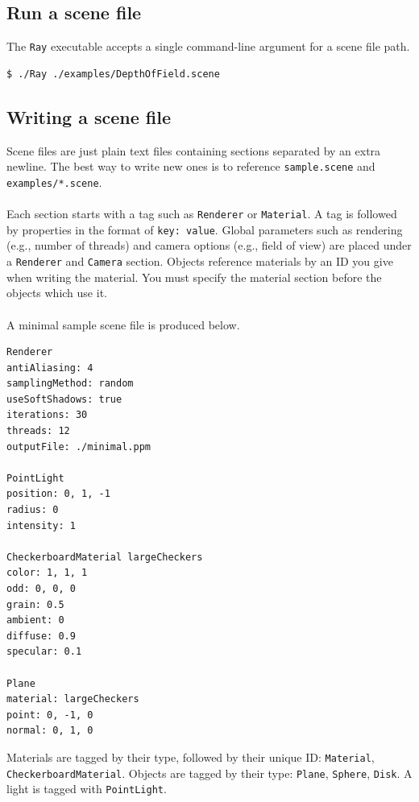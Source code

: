 \documentclass{article}
\begin{document}
\subsection{Run a scene file}

The \texttt{Ray} executable accepts a single command-line argument for a scene file path.

\begin{verbatim}
$ ./Ray ./examples/DepthOfField.scene
\end{verbatim}

\subsection{Writing a scene file}

Scene files are just plain text files containing sections separated by an extra newline.
The best way to write new ones is to reference \texttt{sample.scene} and \texttt{examples/*.scene}.
\\\\
\noindent
Each section starts with a tag such as \texttt{Renderer} or \texttt{Material}.
A tag is followed by properties in the format of \texttt{key: value}.
Global parameters such as rendering (e.g., number of threads) and camera options (e.g., field of view) are placed under a \texttt{Renderer} and \texttt{Camera} section.
Objects reference materials by an ID you give when writing the material.
You must specify the material section before the objects which use it.
\\\\
\noindent
A minimal sample scene file is produced below.

\begin{verbatim}
Renderer
antiAliasing: 4
samplingMethod: random
useSoftShadows: true
iterations: 30
threads: 12
outputFile: ./minimal.ppm

PointLight
position: 0, 1, -1
radius: 0
intensity: 1

CheckerboardMaterial largeCheckers
color: 1, 1, 1
odd: 0, 0, 0
grain: 0.5
ambient: 0
diffuse: 0.9
specular: 0.1

Plane
material: largeCheckers
point: 0, -1, 0
normal: 0, 1, 0
\end{verbatim}

\noindent
Materials are tagged by their type, followed by their unique ID: \texttt{Material}, \texttt{CheckerboardMaterial}.
Objects are tagged by their type: \texttt{Plane}, \texttt{Sphere}, \texttt{Disk}.
A light is tagged with \texttt{PointLight}.
\end{document}
